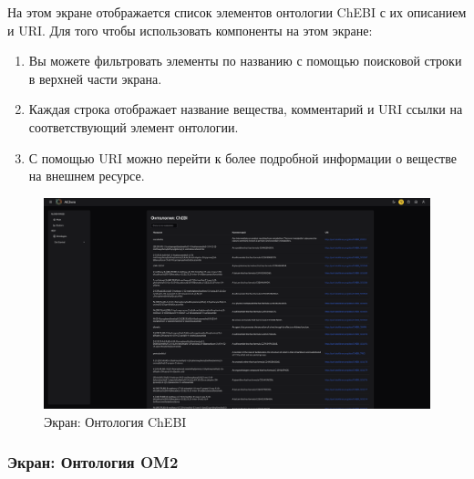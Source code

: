 \documentclass[a4paper,12pt,reqno]{article}
\begin{document}
На этом экране отображается список элементов онтологии ChEBI с их описанием и URI. Для того чтобы использовать компоненты на этом экране:
\begin{enumerate}
    \item Вы можете фильтровать элементы по названию с помощью поисковой строки в верхней части экрана.
    \item Каждая строка отображает название вещества, комментарий и URI ссылки на соответствующий элемент онтологии.
    \item С помощью URI можно перейти к более подробной информации о веществе на внешнем ресурсе.
\end{enumerate}
\begin{figure}[H]
    \centering
    \includegraphics[width=\textwidth]{RO/img/chebi_doc.png} %
    \caption{Экран: Онтология ChEBI}
    \label{fig:chebi}
\end{figure}

\subsubsection{Экран: Онтология OM2}
\end{document}
